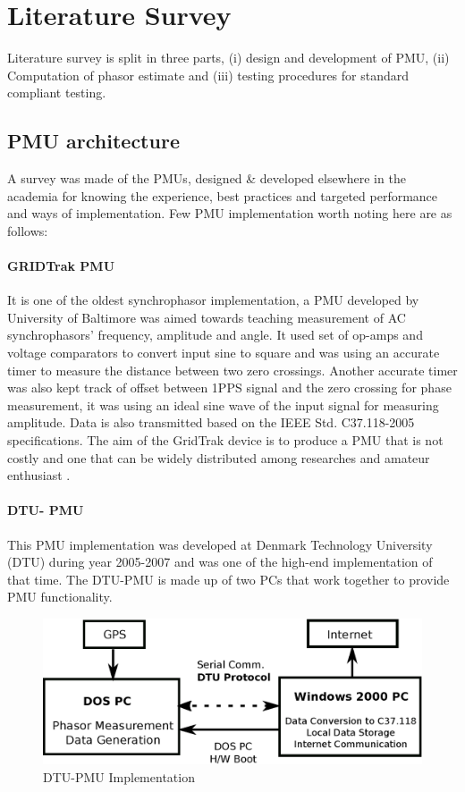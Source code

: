 \chapter{Literature Survey}
Literature survey is split in three parts, (i) design and development of PMU, (ii) Computation of phasor estimate and (iii) testing procedures for standard compliant testing.


\section{PMU architecture}
A survey was made of the PMUs, designed \& developed elsewhere in the academia for knowing the experience, best practices and targeted performance and ways of implementation. Few PMU implementation worth noting here are as follows:

\subsubsection{GRIDTrak PMU} It is one of the oldest synchrophasor implementation, a PMU developed by University of Baltimore \cite{dotta2014teaching} was aimed towards teaching measurement of AC synchrophasors' frequency, amplitude and angle. It used set of op-amps and voltage comparators to convert input sine to square and was using an accurate timer to measure the distance between two zero crossings. Another accurate timer was also kept track of offset between 1PPS signal and the zero crossing for phase measurement, it was using an ideal sine wave of the input signal for measuring amplitude. Data is also transmitted based on the IEEE Std. C37.118-2005 specifications. The aim of the GridTrak device is to produce a PMU that is not costly and one that can be widely distributed among researches and amateur enthusiast \cite{stadlin2013gridtrak}.

\subsubsection{DTU- PMU}
This PMU implementation was developed at Denmark Technology University (DTU) during year 2005-2007 \cite{garcia2010dtu} and was one of the high-end implementation of that time. The DTU-PMU is made up of two PCs that work together to provide PMU functionality.
\begin{figure}
	\centering
	\includegraphics[scale=0.4]{fig/DTU-PMU.eps}
	\caption{DTU-PMU Implementation}
	\label{fig:dtu-pmu}
\end{figure}


